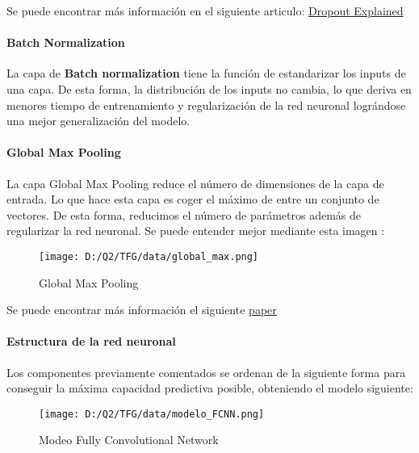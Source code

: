 \documentclass[10pt,riqno,a4paper,twoside]{article}\usepackage[]{graphicx}\usepackage[]{color}
\begin{document}
Se puede encontrar más información en el siguiente articulo: \href{https://leimao.github.io/blog/Dropout-Explained/}{Dropout Explained} \cite{dropout}


\paragraph{Batch Normalization}

\label{batch}

La capa de \textbf{Batch normalization} tiene la función de estandarizar los inputs de una capa. De esta forma, la distribución de los inputs no cambia, lo que deriva en menores tiempo de entrenamiento y regularización de la red neuronal lográndose una mejor generalización del modelo. 
 
\paragraph{Global Max Pooling}

\label{MaxPool}

La capa Global Max Pooling reduce el número de dimensiones de la capa de entrada. Lo que hace esta capa es coger el máximo de entre un conjunto de vectores. De esta forma, reducimos el número de parámetros además de regularizar la red neuronal. Se puede entender mejor mediante esta imagen : 


\begin{figure}[h]
\begin{center}
  \caption{Global Max Pooling}
\texttt{[image: D:/Q2/TFG/data/global\_max.png]}
\end{center}
\end{figure}

Se puede encontrar más información el siguiente \href{https://arxiv.org/pdf/1908.05040.pdf}{paper} \cite{MaxPool}

\paragraph{Estructura de la red neuronal}

Los componentes previamente comentados se ordenan de la siguiente forma para conseguir la máxima capacidad predictiva posible, obteniendo el modelo siguiente:

\label{red_FCNN}


\begin{figure}[h]
\begin{center}
  \caption{Modeo Fully Convolutional Network}
\texttt{[image: D:/Q2/TFG/data/modelo\_FCNN.png]}
\end{center}
\end{figure}
\end{document}
